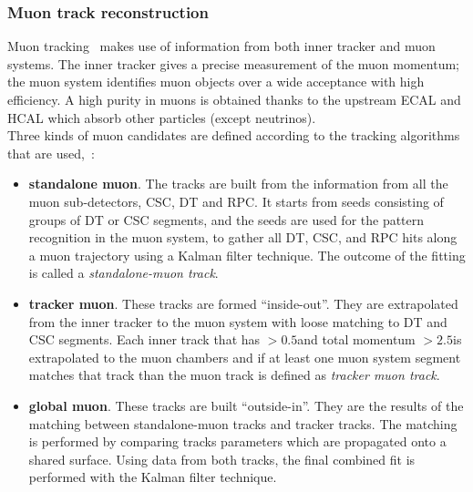 \subsubsection{Muon track reconstruction}\label{sec:c2muonreco}
Muon tracking~\cite{collaboration_2013,Sirunyan_2018_muon} makes use of information from
both inner tracker and muon systems. The
inner tracker gives a precise measurement of the muon momentum; the
muon system identifies muon objects over a wide acceptance with high efficiency. A high purity in muons is obtained
thanks to the upstream ECAL and HCAL which absorb other particles
(except neutrinos). \\
Three kinds of muon
candidates are defined according to the tracking algorithms that are used,~\cite{Sirunyan_2018_muon}:
\begin{itemize}
\setlength\itemsep{-0.2em}
\item \textbf{standalone muon}. The tracks are built from the
  information from all the muon sub-detectors, CSC, DT and RPC. It
  starts from seeds consisting of groups of DT or CSC segments, and
  the seeds are used for the pattern recognition in the muon system, to
gather all DT, CSC, and RPC hits along a muon trajectory using a
Kalman filter technique. The outcome of the fitting is called a
\emph{standalone-muon track}.
\item \textbf{tracker muon}. These tracks are formed
  ``inside-out''. They are extrapolated from the inner
  tracker to the muon system with loose matching to DT and CSC
  segments. Each inner track that has \pt$>0.5$\GeV and total
  momentum $>2.5$\GeV is extrapolated to the muon chambers and if at
  least one muon system segment matches that track than the muon track is defined as \emph{tracker
  muon track}. 
\item \textbf{global muon}. These tracks are built
  ``outside-in''. They are the results of the matching between
  standalone-muon tracks and tracker tracks. The matching is performed by
  comparing tracks parameters which are propagated onto a shared
  surface. Using data from both tracks, the final combined fit is performed with the Kalman filter technique.
\end{itemize}

